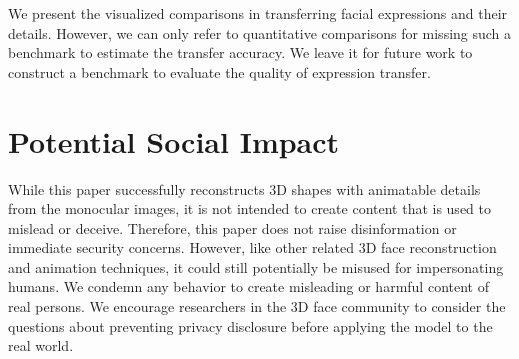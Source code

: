 We present the visualized comparisons in transferring facial expressions and their details. However, we can only refer to quantitative comparisons for missing such a benchmark to estimate the transfer accuracy. We leave it for future work to construct a benchmark to evaluate the quality of expression transfer.

\section{Potential Social Impact} \label{sec.supp_social}


While this paper successfully reconstructs 3D shapes with animatable details from the monocular images, it is not intended to create content that is used to mislead or deceive. Therefore, this paper does not raise disinformation or immediate security concerns.
However, like other related 3D face reconstruction and animation techniques, it could still potentially be misused for impersonating humans. We condemn any behavior to create misleading or harmful content of real persons.
We encourage researchers in the 3D face community to consider the questions about preventing privacy disclosure before applying the model to the real world.
%